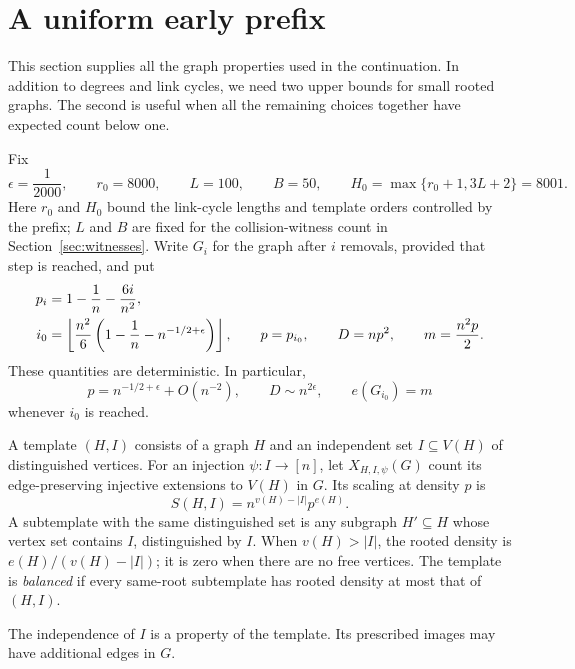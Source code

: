\section{A uniform early prefix}
\label{sec:prefix}

This section supplies all the graph properties used in the continuation.
In addition to degrees and link cycles, we need two upper bounds for
small rooted graphs. The second is useful when all the remaining choices
together have expected count below one.

Fix
\begin{equation}\label{eq:constants}
 \epsilon=\frac1{2000},\qquad r_0=8000,\qquad
 L=100,\qquad B=50,\qquad
 H_0=\max\{r_0+1,3L+2\}=8001.
\end{equation}
Here $r_0$ and $H_0$ bound the link-cycle lengths and template orders
controlled by the prefix; $L$ and $B$ are fixed for the collision-witness
count in Section~\ref{sec:witnesses}.
Write $G_i$ for the graph after $i$ removals, provided that step is reached,
and put
\begin{align}
 p_i&=1-\frac1n-\frac{6i}{n^2},\notag\\
 i_0&=\left\lfloor\frac{n^2}{6}
             \left(1-\frac1n-n^{-1/2+\epsilon}\right)\right\rfloor,
 \qquad p=p_{i_0},\qquad D=np^2,\qquad m=\frac{n^2p}{2}.
 \label{eq:prefix-time}
\end{align}
These quantities are deterministic. In particular,
\begin{equation}\label{eq:scales}
 p=n^{-1/2+\epsilon}+O(n^{-2}),\qquad
 D\sim n^{2\epsilon},\qquad e(G_{i_0})=m
\end{equation}
whenever $i_0$ is reached.

\begin{definition}\label{def:template}
A template $(H,I)$ consists of a graph $H$ and an independent set
$I\subseteq V(H)$ of distinguished vertices. For an injection
$\psi:I\to[n]$, let $X_{H,I,\psi}(G)$ count its edge-preserving injective
extensions to $V(H)$ in $G$. Its scaling at density $p$ is
\[
 S(H,I)=n^{v(H)-|I|}p^{e(H)}.
\]
A subtemplate with the same distinguished set is any subgraph
$H'\subseteq H$ whose vertex set contains $I$, distinguished by $I$.
When $v(H)>|I|$, the rooted density is $e(H)/(v(H)-|I|)$; it is zero
when there are no free vertices. The template is \emph{balanced} if
every same-root subtemplate has rooted density at most that of $(H,I)$.
\end{definition}

The independence of $I$ is a property of the template. Its prescribed
images may have additional edges in $G$.

